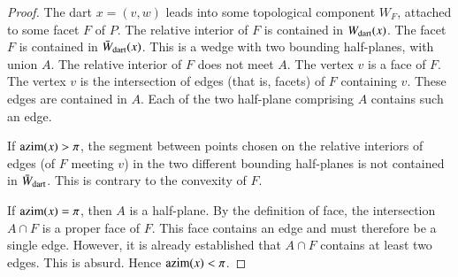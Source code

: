 \begin{proof}   The dart $x=(v,w)$ leads into some topological component $W_F$, attached to some facet $F$ of $P$.  The relative interior of $F$ is contained in $W_{\text{dart}}(x)$.  The facet $F$ is contained in $\bar W_{\text{dart}}(x)$. This is a wedge with two bounding half-planes, with union $A$.  The relative interior of $F$ does not meet $A$.   The vertex $v$ is a face of $F$.  The vertex $v$ is the intersection of edges (that is, facets) of $F$ containing $v$.  These edges are contained in $A$.  Each of the two half-plane comprising $A$ contains such an edge. 

If ${\operatorname{azim}}(x)>\pi$, the segment between points chosen on the relative interiors of edges (of $F$ meeting $v$) in the two different bounding half-planes is not contained in $\bar W_{\text{dart}}$.  This is contrary to the convexity of $F$.

If ${\operatorname{azim}}(x)=\pi$, then $A$ is a half-plane.  By the definition of face, the intersection $A\cap F$ is a proper face of $F$.  This face contains an edge and must therefore be a single edge.  However, it is already established that $A\cap F$ contains at least two edges.  This is absurd.  Hence ${\operatorname{azim}}(x)<\pi$.
\end{proof}


